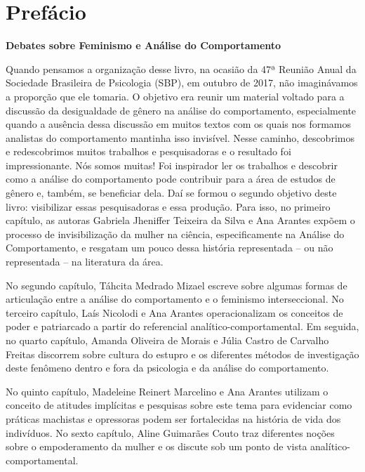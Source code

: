 \chapter*{Prefácio}
\begin{center}
    \textbf{\large Debates sobre Feminismo e Análise do Comportamento}
\end{center}

Quando pensamos a organização desse livro, na ocasião da 47ª Reunião Anual da Sociedade Brasileira de Psicologia (SBP), em outubro de 2017, não imaginávamos a proporção que ele tomaria. O objetivo era reunir um material voltado para a discussão da desigualdade de gênero na análise do comportamento, especialmente quando a ausência dessa discussão em muitos textos com os quais nos formamos analistas do comportamento mantinha isso invisível. Nesse caminho, descobrimos e redescobrimos muitos trabalhos e pesquisadoras e o resultado foi impressionante. Nós somos muitas! Foi inspirador ler os trabalhos e descobrir como a análise do comportamento pode contribuir para a área de estudos de gênero e, também, se beneficiar dela. Daí se formou o segundo objetivo deste livro: visibilizar essas pesquisadoras e essa produção. Para isso, no primeiro capítulo, as autoras Gabriela Jheniffer Teixeira da Silva e Ana Arantes expõem o processo de invisibilização da mulher na ciência, especificamente na Análise do Comportamento, e resgatam um pouco dessa história representada – ou não representada – na literatura da área.

No segundo capítulo, Táhcita Medrado Mizael escreve sobre algumas formas de articulação entre a análise do comportamento e o feminismo interseccional. No terceiro capítulo, Laís Nicolodi e Ana Arantes operacionalizam os conceitos de poder e patriarcado a partir do referencial analítico-comportamental. Em seguida, no quarto capítulo, Amanda Oliveira de Morais e Júlia Castro de Carvalho Freitas discorrem sobre cultura do estupro e os diferentes métodos de investigação deste fenômeno dentro e fora da psicologia e da análise do comportamento. 

No quinto capítulo, Madeleine Reinert Marcelino e Ana Arantes utilizam o conceito de atitudes implícitas e pesquisas sobre este tema para evidenciar como práticas machistas e opressoras podem ser fortalecidas na história de vida dos indivíduos. No sexto capítulo, Aline Guimarães Couto traz diferentes noções sobre o empoderamento da mulher e os discute sob um ponto de vista analítico-comportamental.

